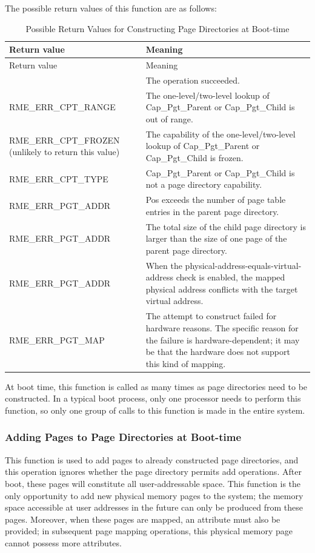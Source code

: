 The possible return values of this function are as follows:

\begin{xltabular}{\textwidth}{@{}>{\hsize\raggedright\arraybackslash}X>{\hsize\raggedright\arraybackslash}X@{}}
\caption{Possible Return Values for Constructing Page Directories at Boot-time}\label{tab:7-48-construct-page-directory-at-boot-return-values}\\
\toprule
Return value & Meaning\tabularnewline
\endfirsthead
\toprule
Return value & Meaning\tabularnewline
\midrule
\endhead
\bottomrule
{} & The operation succeeded.\tabularnewline
    RME\_ERR\_CPT\_RANGE & The one-level/two-level lookup of Cap\_Pgt\_Parent or Cap\_Pgt\_Child is out of range.\tabularnewline
    RME\_ERR\_CPT\_FROZEN (unlikely to return this value) & The capability of the one-level/two-level lookup of Cap\_Pgt\_Parent or Cap\_Pgt\_Child is frozen.\tabularnewline
    RME\_ERR\_CPT\_TYPE & Cap\_Pgt\_Parent or Cap\_Pgt\_Child is not a page directory capability.\tabularnewline
    RME\_ERR\_PGT\_ADDR & Pos exceeds the number of page table entries in the parent page directory.\tabularnewline
    RME\_ERR\_PGT\_ADDR & The total size of the child page directory is larger than the size of one page of the parent page directory.\tabularnewline
    RME\_ERR\_PGT\_ADDR & When the physical-address-equals-virtual-address check is enabled, the mapped physical address conflicts with the target virtual address.\tabularnewline
    RME\_ERR\_PGT\_MAP & The attempt to construct failed for hardware reasons. The specific reason for the failure is hardware-dependent; it may be that the hardware does not support this kind of mapping.\tabularnewline
\end{xltabular}
\nopagebreak[4]

At boot time, this function is called as many times as page directories need to be constructed. In a typical boot process, only one processor needs to perform this function, so only one group of calls to this function is made in the entire system.

\subsubsection{Adding Pages to Page Directories at Boot-time}\label{subsubsec:7-add-page-to-page-directory-at-boot}

This function is used to add pages to already constructed page directories, and this operation ignores whether the page directory permits add operations. After boot, these pages will constitute all user-addressable space. This function is the only opportunity to add new physical memory pages to the system; the memory space accessible at user addresses in the future can only be produced from these pages. Moreover, when these pages are mapped, an attribute must also be provided; in subsequent page mapping operations, this physical memory page cannot possess more attributes.


